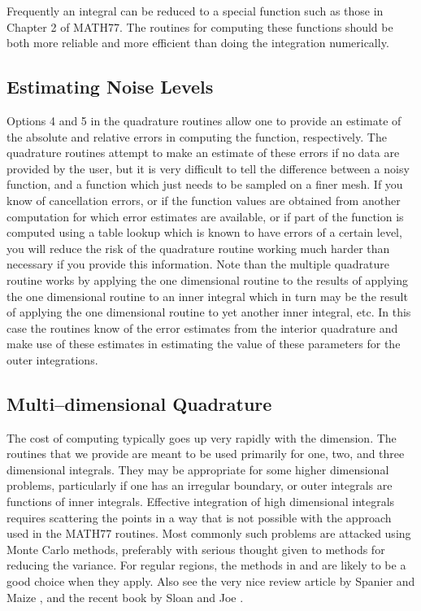 \documentclass[twoside]{MATH77}
\begin{document}
Frequently an integral can be reduced to a special function such as
those in Chapter 2 of MATH77.  The routines for computing these
functions should be both more reliable and more efficient than doing
the integration numerically.

\subsection{Estimating Noise Levels}\label{noise}

Options 4 and 5 in the quadrature routines allow one to provide an
estimate of the absolute and relative errors in computing the function,
respectively.  The quadrature routines attempt to make an estimate of
these errors if no data are provided by the user, but it is very difficult
to tell the difference between a noisy function, and a function which just
needs to be sampled on a finer mesh.  If you know of cancellation errors,
or if the function values are obtained from another computation for which
error estimates are available, or if part of the function is computed
using a table lookup which is known to have errors of a certain level, you
will reduce the risk of the quadrature routine working much harder than
necessary if you provide this information.  Note than the multiple
quadrature routine works by applying the one dimensional routine to the
results of applying the one dimensional routine to an inner integral which
in turn may be the result of applying the one dimensional routine to yet
another inner integral, etc.  In this case the routines know of the error
estimates from the interior quadrature and make use of these estimates in
estimating the value of these parameters for the outer integrations.

\subsection{Multi--dimensional Quadrature}\label{multi_dim}

The cost of computing typically goes up very rapidly with the dimension.
The routines that we provide are meant to be used primarily for one, two,
and three dimensional integrals.  They may be appropriate for some higher
dimensional problems, particularly if one has an irregular boundary, or
outer integrals are functions of inner integrals.  Effective integration
of high dimensional integrals requires scattering the points in a way that
is not possible with the approach used in the MATH77 routines.  Most
commonly such problems are attacked using Monte Carlo methods, preferably
with serious thought given to methods for reducing the variance.  For
regular regions, the methods in \cite{Stroud:1971:ACM} and
\cite{Cools:1993:MCR} are likely to be a good choice when they apply.
Also see the very nice review article by Spanier and Maize
\cite{Spanier:1994:QRM}, and the recent book by Sloan and Joe
\cite{Sloan:1995:LMM}.
\end{document}
